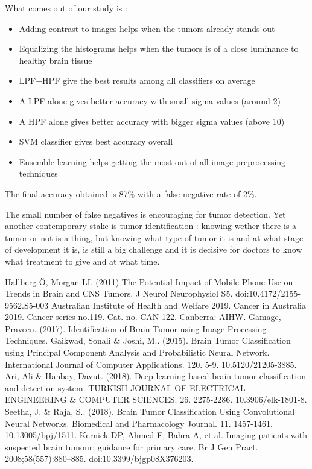 \documentclass[conference]{IEEEtran}
\begin{document}
What comes out of our study is :
\begin{itemize}
\item Adding contrast to images helps when the tumors already stands out
\item Equalizing the histograms helps when the tumors is of a close luminance to healthy brain tissue
\item LPF+HPF give the best results among all classifiers on average
\item A LPF alone gives better accuracy with small sigma values (around 2)
\item A HPF alone gives better accuracy with bigger sigma values (above 10)
\item SVM classifier gives best accuracy overall
\item Ensemble learning helps getting the most out of all image preprocessing techniques
\end{itemize}
The final accuracy obtained is 87\% with a false negative rate of 2\%.

The small number of false negatives is encouraging for tumor detection. Yet another contemporary stake is tumor identification : knowing wether there is a tumor or not is a thing, but knowing what type of tumor it is and at what stage of development it is, is still a big challenge and it is decisive for doctors to know what treatment to give and at what time.


\begin{thebibliography}{00}
 Hallberg Ö, Morgan LL (2011) The Potential Impact of Mobile Phone Use on Trends in Brain and CNS Tumors. J Neurol Neurophysiol S5. doi:10.4172/2155-9562.S5-003
 Australian Institute of Health and Welfare 2019. Cancer in Australia 2019. Cancer series no.119. Cat. no. CAN 122. Canberra: AIHW.
 Gamage, Praveen. (2017). Identification of Brain Tumor using Image Processing Techniques. 
 Gaikwad, Sonali \& Joshi, M.. (2015). Brain Tumor Classification using Principal Component Analysis and Probabilistic Neural Network. International Journal of Computer Applications. 120. 5-9. 10.5120/21205-3885.
 Ari, Ali \& Hanbay, Davut. (2018). Deep learning based brain tumor classification and detection system. TURKISH JOURNAL OF ELECTRICAL ENGINEERING \& COMPUTER SCIENCES. 26. 2275-2286. 10.3906/elk-1801-8.
 Seetha, J. \& Raja, S.. (2018). Brain Tumor Classification Using Convolutional Neural Networks. Biomedical and Pharmacology Journal. 11. 1457-1461. 10.13005/bpj/1511. 
 Kernick DP, Ahmed F, Bahra A, et al. Imaging patients with suspected brain tumour: guidance for primary care. Br J Gen Pract. 2008;58(557):880–885. doi:10.3399/bjgp08X376203.
\end{thebibliography}
\end{document}
